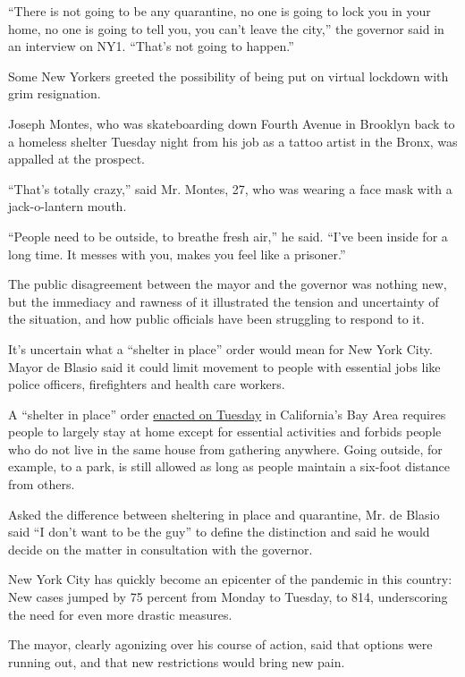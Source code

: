 ``There is not going to be any quarantine, no one is going to lock you
in your home, no one is going to tell you, you can't leave the city,''
the governor said in an interview on NY1. ``That's not going to
happen.''

Some New Yorkers greeted the possibility of being put on virtual
lockdown with grim resignation.

Joseph Montes, who was skateboarding down Fourth Avenue in Brooklyn back
to a homeless shelter Tuesday night from his job as a tattoo artist in
the Bronx, was appalled at the prospect.

``That's totally crazy,'' said Mr. Montes, 27, who was wearing a face
mask with a jack-o-lantern mouth.

``People need to be outside, to breathe fresh air,'' he said. ``I've
been inside for a long time. It messes with you, makes you feel like a
prisoner.''

The public disagreement between the mayor and the governor was nothing
new, but the immediacy and rawness of it illustrated the tension and
uncertainty of the situation, and how public officials have been
struggling to respond to it.

It's uncertain what a ``shelter in place'' order would mean for New York
City. Mayor de Blasio said it could limit movement to people with
essential jobs like police officers, firefighters and health care
workers.

A ``shelter in place'' order
\href{https://www.nytimes.com/2020/03/17/us/shelter-in-place-order-bay-area.html}{enacted
on Tuesday} in California's Bay Area requires people to largely stay at
home except for essential activities and forbids people who do not live
in the same house from gathering anywhere. Going outside, for example,
to a park, is still allowed as long as people maintain a six-foot
distance from others.

Asked the difference between sheltering in place and quarantine, Mr. de
Blasio said ``I don't want to be the guy'' to define the distinction and
said he would decide on the matter in consultation with the governor.

New York City has quickly become an epicenter of the pandemic in this
country: New cases jumped by 75 percent from Monday to Tuesday, to 814,
underscoring the need for even more drastic measures.

The mayor, clearly agonizing over his course of action, said that
options were running out, and that new restrictions would bring new
pain.

